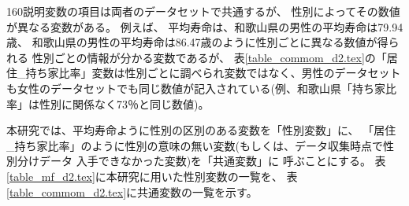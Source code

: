 160説明変数の項目は両者のデータセットで共通するが、
性別によってその数値が異なる変数がある。
例えば、
平均寿命は、和歌山県の男性の平均寿命は79.94歳、
和歌山県の男性の平均寿命は86.47歳のように性別ごとに異なる数値が得られる
性別ごとの情報が分かる変数であるが、
表\ref{table_commom_d2.tex}の「居住\_持ち家比率」変数は性別ごとに調べられ変数ではなく、男性のデータセットも女性のデータセットでも同じ数値が記入されている(例、和歌山県「持ち家比率」は性別に関係なく73％と同じ数値)。

%


本研究では、平均寿命ように性別の区別のある変数を「性別変数」に、
「居住\_持ち家比率」のように性別の意味の無い変数(もしくは、データ収集時点で性別分けデータ
入手できなかった変数)を「共通変数」に
呼ぶことにする。
表\ref{table_mf_d2.tex}に本研究に用いた性別変数の一覧を、
表\ref{table_commom_d2.tex}に共通変数の一覧を示す。



%


%









%
%
%
%
%

%
%



%


